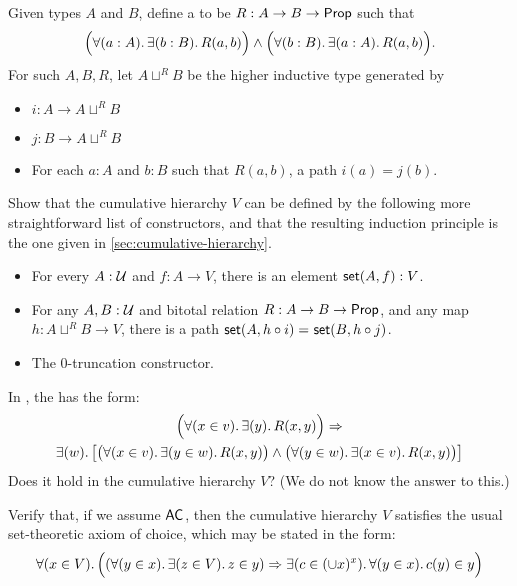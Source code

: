 \begin{ex}\label{ex:cumhierhit}
  Given types $A$ and $B$, define a 
  to be $R:A\to B\to \mathsf{Prop}$ such that
  \[ \Big(\fall{a:A}\exis{b:B} R(a,b) \Big) \land \Big(\fall{b:B}\exis{a:A} R(a,b) \Big). \]
  For such $A,B,R$, let $A\sqcup^R B$ be the higher inductive type generated by
  \begin{itemize}
  \item $i:A\to A\sqcup^R B$
  \item $j:B\to A\sqcup^R B$
  \item For each $a:A$ and $b:B$ such that $R(a,b)$, a path $i(a)=j(b)$.
  \end{itemize}
  Show that the cumulative hierarchy $V$ can be defined by the following more straightforward list of constructors, and that the resulting induction principle is the one given in \cref{sec:cumulative-hierarchy}.
  \begin{itemize}
  \item For every $A : \mathcal{U}$ and $f : A \to V$, there is an element $\mathsf{set}(A, f) : V$.
  \item For any $A,B:\mathcal{U}$ and bitotal relation
    $R:A\to B\to \mathsf{Prop}$, and any map $h:A\sqcup^R B \to V$, there is a path $\mathsf{set}(A,h\circ i) =_{} \mathsf{set}(B,h\circ j)$.
  \item The 0-truncation constructor.
  \end{itemize}
\end{ex}

\begin{ex}\label{ex:strong-collection}
  In \CZF, the 
  has the form:
   \begin{multline*}
   \Parens{\fall{x\in v}\exis{y} R(x,y)} \Rightarrow \\
   \exis{w}\big[\big(\fall{x\in v}\exis{y\in w}R(x,y)\big)\land \big(\fall{y\in w}\exis{x\in v}R(x,y) \big)\big]
   \end{multline*}
   Does it hold in the cumulative hierarchy $V$?  (We do not know the answer to this.)
\end{ex}

\begin{ex}\label{ex:choice-cumulative-hierarchy-choice}
Verify that, if we assume $\mathsf{AC}_{}$, then the cumulative hierarchy $V$ satisfies the usual set-theoretic axiom of choice, which may be stated in the form:
  \[
   \fall{x\in V} \Parens{(\fall{y\in x}\exis{z\in V} z\in y) \Rightarrow  \exis{c\in(\cup x)^x}\fall{y\in x} c(y)\in y}
   \]
\end{ex}

